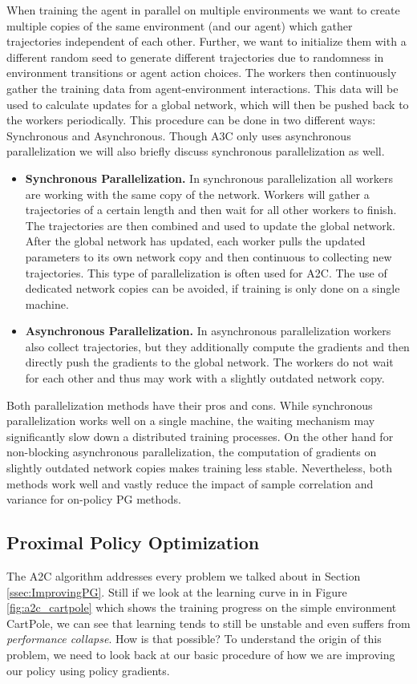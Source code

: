 When training the agent in parallel on multiple environments we want to create multiple copies of the same environment (and our agent) which gather trajectories independent of each other. Further, we want to initialize them with a different random seed to generate different trajectories due to randomness in environment transitions or agent action choices. The workers then continuously gather the training data from agent-environment interactions. This data will be used to calculate updates for a global network, which will then be pushed back to the workers periodically. This procedure can be done in two different ways: Synchronous and Asynchronous. Though A3C only uses asynchronous parallelization we will also briefly discuss synchronous parallelization as well.
\begin{itemize}
  \item \textbf{Synchronous Parallelization.} In synchronous parallelization all workers are working with the same copy of the network. Workers will gather a trajectories of a certain length and then wait for all other workers to finish. The trajectories are then combined and used to update the global network. After the global network has updated, each worker pulls the updated parameters to its own network copy and then continuous to collecting new trajectories. This type of parallelization is often used for A2C. The use of dedicated network copies can be avoided, if training is only done on a single machine.
  \item \textbf{Asynchronous Parallelization.} In asynchronous parallelization workers also collect trajectories, but they additionally compute the gradients and then directly push the gradients to the global network. The workers do not wait for each other and thus may work with a slightly outdated network copy. 
\end{itemize}
Both parallelization methods have their pros and cons. While synchronous parallelization works well on a single machine, the waiting mechanism may significantly slow down a distributed training processes. On the other hand for non-blocking asynchronous parallelization, the computation of gradients on slightly outdated network copies makes training less stable. Nevertheless, both methods work well and vastly reduce the impact of sample correlation and variance for on-policy PG methods. 


\subsection{Proximal Policy Optimization} \label{ssec:PPO}
The A2C algorithm addresses every problem we talked about in Section \ref{ssec:ImprovingPG}. Still if we look at the learning curve in in Figure \ref{fig:a2c_cartpole} which shows the training progress on the simple environment CartPole, we can see that learning tends to still be unstable and even suffers from \textit{performance collapse}. How is that possible? To understand the origin of this problem, we need to look back at our basic procedure of how we are improving our policy using policy gradients.


